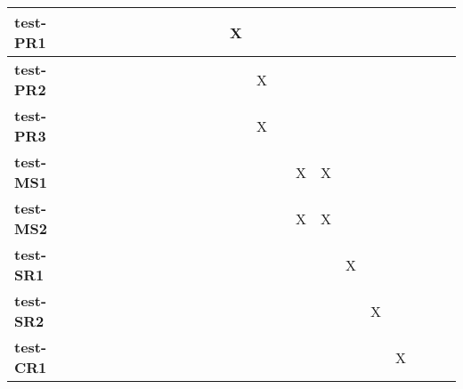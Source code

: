 \documentclass[12pt, titlepage]{article}
\begin{document}
\begin{landscape}
\begin{table}[H]
\begin{adjustwidth}{-0.3in}{-0.5in}
{\begin{tabular}{c|c|c|c|c|c|c|c|c|c|c|c|c|c|c|c|c|c|c|c|c|c|}
\multicolumn{1}{|l|}{\textbf{test-PR1}}   &             &             &              &             &             &             &             &             &              &              &      X        &              &             &             &             &       & &&&&      \\ \hline
\multicolumn{1}{|l|}{\textbf{test-PR2}}   &              &              &              &              &              &             &             &             &             &             &             &    X         &              &              &            &      &   &&&&     \\ \hline
\multicolumn{1}{|l|}{\textbf{test-PR3}}   &             &             &              &             &             &             &            &             &              &              &              &      X        &             &             &             &     &   &&&&      \\ \hline
\multicolumn{1}{|l|}{\textbf{test-MS1}}   &             &             &             &             &             &              &             &             &              &              &              &             &              &      X       &      X      &         &&&&&     \\ \hline
\multicolumn{1}{|l|}{\textbf{test-MS2}}   &             &             &             &             &             &              &             &             &              &              &              &             &              &       X      &       X      &         &&&&&     \\ \hline
\multicolumn{1}{|l|}{\textbf{test-SR1}}   &             &             &             &             &             &              &             &             &              &              &              &             &              &             &             &    X     &&&&&     \\ \hline
\multicolumn{1}{|l|}{\textbf{test-SR2}}   &             &             &             &             &             &              &             &             &              &              &              &             &              &             &             &         &X&&&&     \\ \hline
\multicolumn{1}{|l|}{\textbf{test-CR1}}   &             &             &             &             &             &              &             &             &              &              &              &             &              &             &             &         &&X&&&     \\ \hline

\end{tabular}}
\end{adjustwidth}
\end{table}
\end{landscape}
\end{document}
